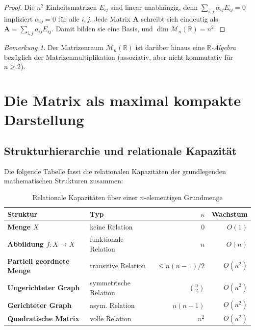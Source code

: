 ﻿\documentclass[12pt, a4paper]{article}
\theoremstyle{definition}
\theoremstyle{remark}
\newtheorem{remark}[theorem]{Bemerkung}
\newcommand{\R}{\mathbb{R}}
\newcommand{\vA}{\bm{A}}
\begin{document}
\begin{proof}
Die $n^2$ Einheitsmatrizen $E_{ij}$ sind linear unabhängig, denn
$\sum_{i,j} \alpha_{ij} E_{ij} = 0$ impliziert $\alpha_{ij} = 0$ für
alle $i,j$. Jede Matrix $\vA$ schreibt sich eindeutig als
$\vA = \sum_{i,j} a_{ij} E_{ij}$. Damit bilden sie eine Basis, und
$\dim \mathcal{M}_n(\R) = n^2$.
\end{proof}

\begin{remark}
Der Matrizenraum $\mathcal{M}_n(\R)$ ist darüber hinaus eine
\emph{$\R$-Algebra} bezüglich der Matrizenmultiplikation (assoziativ,
aber nicht kommutativ für $n \geq 2$).
\end{remark}

\section{Die Matrix als maximal kompakte Darstellung}
\label{sec:kompaktheit}

\subsection{Strukturhierarchie und relationale Kapazität}
\label{subsec:hierarchie}

Die folgende Tabelle fasst die relationalen Kapazitäten der grundlegenden
mathematischen Strukturen zusammen:

\begin{table}[H]
\centering
\caption{Relationale Kapazitäten über einer $n$-elementigen Grundmenge}
\label{tab:kapazitaeten}
\begin{tabular}{>{\bfseries}l l r r}
\toprule
Struktur & Typ & $\kappa$ & Wachstum \\
\midrule
Menge $X$ & keine Relation & $0$ & $O(1)$ \\
Abbildung $f: X \to X$ & funktionale Relation & $n$ & $O(n)$ \\
Partiell geordnete Menge & transitive Relation & $\leq n(n-1)/2$ & $O(n^2)$ \\
Ungerichteter Graph & symmetrische Relation & $\binom{n}{2}$ & $O(n^2)$ \\
Gerichteter Graph & asym. Relation & $n(n-1)$ & $O(n^2)$ \\
\textbf{Quadratische Matrix} & volle Relation & $n^2$ & $O(n^2)$ \\
\bottomrule
\end{tabular}
\end{table}
\end{document}
